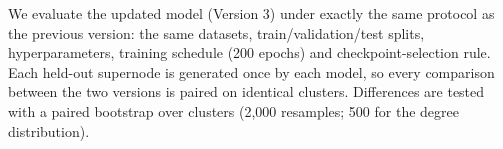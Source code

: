 
We evaluate the updated model (Version 3) under exactly the same protocol as the
previous version: the same datasets, train/validation/test splits,
hyperparameters, training schedule (200 epochs) and checkpoint-selection rule. Each held-out
supernode is generated once by each model, so every comparison between the two
versions is paired on identical clusters. Differences are tested with a paired
bootstrap over clusters (2{,}000 resamples; 500 for the degree distribution).



